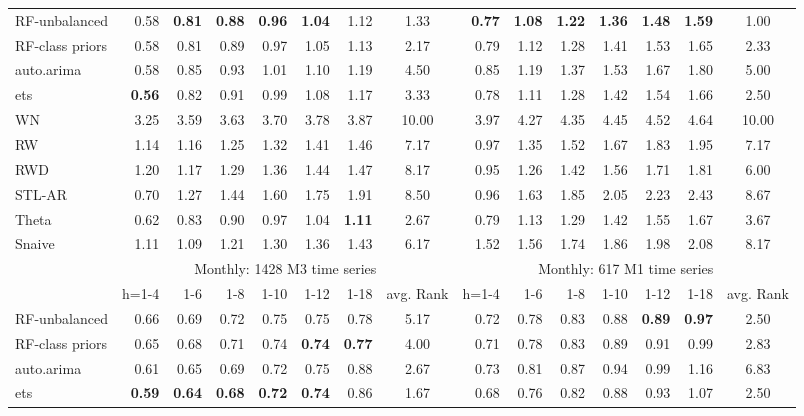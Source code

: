 \documentclass[11pt,a4paper,]{article}
\theoremstyle{definition}
\theoremstyle{definition}
\theoremstyle{definition}
\theoremstyle{remark}
\begin{document}
\begin{table}[!htbp]
\begin{tabular}{lrrrrrrcrrrrrrc}
RF-unbalanced  &  0.58 &  \bf{0.81} & \bf{0.88}  &  \bf{0.96}&\bf{1.04}  &1.12  &  1.33 & \bf{0.77}  & \bf{1.08}  & \bf{1.22}  &  \bf{1.36}&  \bf{1.48}&\bf{1.59}  &  1.00\\ 
RF-class priors & 0.58  & 0.81  & 0.89  & 0.97 &  1.05&1.13  & 2.17 &  0.79 & 1.12  & 1.28& 1.41 & 1.53 & 1.65  & 2.33 \\ 
auto.arima & 0.58  & 0.85  &  0.93 & 1.01 & 1.10 & 1.19 & 4.50 &  0.85 &  1.19 & 1.37  & 1.53 &  1.67 & 1.80 & 5.00 \\ 
ets & \bf{0.56}  &  0.82 &  0.91 &  0.99& 1.08 &  1.17& 3.33 & 0.78  &  1.11 &  1.28 &  1.42& 1.54 &  1.66& 2.50 \\ 
WN  & 3.25  & 3.59  & 3.63  & 3.70 &  3.78& 3.87 &10.00  &  3.97 &  4.27 &  4.35 &  4.45& 4.52 &4.64  &  10.00\\ 
RW  & 1.14  & 1.16  & 1.25  & 1.32 &  1.41& 1.46 &7.17  &0.97   & 1.35  & 1.52  & 1.67 &  1.83& 1.95 & 7.17 \\ 
RWD & 1.20  & 1.17  &1.29   & 1.36 &  1.44& 1.47 &8.17  &0.95   & 1.26  &1.42   &1.56  &  1.71& 1.81 &  6.00\\ 
STL-AR &  0.70 &  1.27 &  1.44 &  1.60& 1.75 &  1.91& 8.50 &  0.96 &  1.63 &  1.85 &  2.05& 2.23 & 2.43 & 8.67 \\ 
Theta &  0.62 & 0.83  & 0.90  & 0.97 &  1.04& \bf{1.11} & 2.67 & 0.79  &  1.13 &  1.29 &1.42  &1.55  & 1.67 & 3.67 \\ 
Snaive & 1.11  &  1.09 &  1.21 &  1.30&  1.36&  1.43& 6.17 &  1.52 &  1.56 &  1.74 &  1.86& 1.98 &2.08  & 8.17 \\ \cmidrule(lr){2-8} \cmidrule(lr){9-15}
 & \multicolumn{7}{c}{Monthly: 1428 M3 time series} & \multicolumn{7}{c}{Monthly: 617 M1 time series} \\ 
  & h=1-4  & 1-6  &  1-8 & 1-10 & 1-12 & 1-18 & avg. Rank &  h=1-4 & 1-6  &  1-8 & 1-10 & 1-12 & 1-18 & avg. Rank\\ \cmidrule(lr){2-8} \cmidrule(lr){9-15}
RF-unbalanced &  0.66 & 0.69  & 0.72  & 0.75 &  0.75& 0.78 &  5.17& 0.72  & 0.78  & 0.83  & 0.88 &  \bf{0.89}&\bf{0.97}  &  2.50\\ 
RF-class priors & 0.65  & 0.68  & 0.71  & 0.74 &  \bf{0.74}&  \bf{0.77}&  4.00& 0.71  & 0.78  & 0.83  & 0.89 &  0.91& 0.99 &  2.83\\ 
auto.arima &  0.61 &  0.65 &  0.69 &  0.72& 0.75 &0.88  & 2.67 &0.73   &0.81   &  0.87 &  0.94& 0.99 & 1.16 & 6.83 \\ 
ets & \bf{0.59}  &  \bf{0.64} &  \bf{0.68} &  \bf{0.72}&\bf{0.74}  &  0.86&1.67  &  0.68 & 0.76  &0.82   & 0.88 & 0.93 &1.07  & 2.50 \\ 

\end{tabular}
\end{table}
\end{document}
